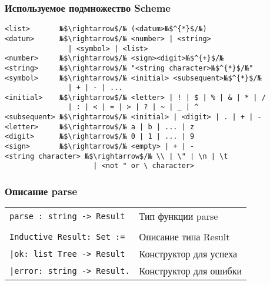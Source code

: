 \documentclass[10pt,a4paper]{beamer}
\begin{document}
\begin{frame}[fragile]
\frametitle{Используемое подмножество Scheme}

\begin{lstlisting}
<list>       №$\rightarrow$/№ (<datum>№$^{*}$/№)
<datum>      №$\rightarrow$/№ <number> | <string>
               | <symbol> | <list>
<number>     №$\rightarrow$/№ <sign><digit>№$^{+}$/№
<string>     №$\rightarrow$/№ "<string character>№$^{*}$/№"
<symbol>     №$\rightarrow$/№ <initial> <subsequent>№$^{*}$/№
               | + | - | ...
<initial>    №$\rightarrow$/№ <letter> | ! | $ | % | & | * | /
               | : | < | = | > | ? | ~ | _ | ^
<subsequent> №$\rightarrow$/№ <initial> | <digit> | . | + | -
<letter>     №$\rightarrow$/№ a | b | ... | z
<digit>      №$\rightarrow$/№ 0 | 1 | ... | 9
<sign>       №$\rightarrow$/№ <empty> | + | -
<string character> №$\rightarrow$/№ \\ | \" | \n | \t
                     | <not " or \ character>
\end{lstlisting}

\end{frame}

\begin{frame}[fragile]
\frametitle{Описание parse}

\begin{tabular}{ll}

\texttt{parse : string -> Result} & Тип функции parse \\
\\
\texttt{Inductive Result: Set :=}  & Описание типа Result \\
\texttt{|ok: list Tree -> Result}  & Конструктор для успеха \\
\texttt{|error: string -> Result.} & Конструктор для ошибки \\

\end{tabular}


\end{frame}
\end{document}
